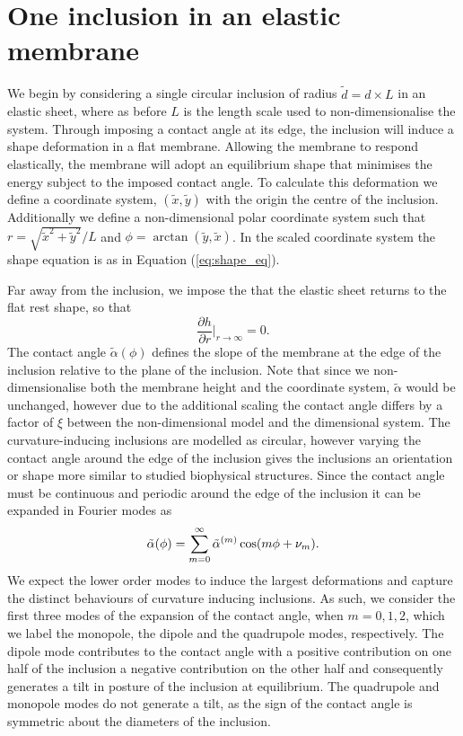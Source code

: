 \section{One inclusion in an elastic membrane}
We begin by considering a single circular inclusion of radius $\tilde{d}=d \times L$ in an elastic sheet, where as before $L$ is the length scale used to non-dimensionalise the system. Through imposing a contact angle at its edge, the inclusion will induce a shape deformation in a flat membrane. Allowing the membrane to respond elastically, the membrane will adopt an equilibrium shape that minimises the energy subject to the imposed contact angle. To calculate this deformation we define a coordinate system, $(\tilde{x}, \tilde{y})$ with the origin the centre of the inclusion. Additionally we define a non-dimensional polar coordinate system such that $r=\sqrt{\tilde{x}^2 + \tilde{y}^2}/L$ and $\phi = \arctan(\tilde{y}, \tilde{x})$. In the scaled coordinate system the shape equation is as in Equation (\ref{eq:shape_eq}).

Far away from the inclusion, we impose the that the elastic sheet returns to the flat rest shape, so that
\begin{equation}
    \frac{\partial h}{\partial r} \biggr\rvert_{r\to\infty} = 0.
    \label{eq:flatfarfield}
\end{equation}
The contact angle $\tilde{\alpha}(\phi)$ defines the slope of the membrane at the edge of the inclusion relative to the plane of the inclusion. Note that since we non-dimensionalise both the membrane height and the coordinate system, $\tilde{\alpha}$ would be unchanged, however due to the additional scaling the contact angle differs by a factor of $\xi$ between the non-dimensional model and the dimensional system. The curvature-inducing inclusions are modelled as circular, however varying the contact angle around the edge of the inclusion gives the inclusions an orientation or shape more similar to studied biophysical structures. Since the contact angle must be continuous and periodic around the edge of the inclusion it can be expanded in Fourier modes as
\begin{equation}
\Tilde{\alpha}(\phi) = \sum_{m=0}^{\infty}\Tilde{\alpha}^{(m)}\cos(m\phi + \nu_{m}).
\end{equation}
We expect the lower order modes to induce the largest deformations and capture the distinct behaviours of curvature inducing inclusions. As such, we consider the first three modes of the expansion of the contact angle, when $m=0, 1, 2$, which we label the monopole, the dipole and the quadrupole modes, respectively. The dipole mode contributes to the contact angle with a positive contribution on one half of the inclusion a negative contribution on the other half and consequently generates a tilt in posture of the inclusion at equilibrium. The quadrupole and monopole modes do not generate a tilt, as the sign of the contact angle is symmetric about the diameters of the inclusion.

